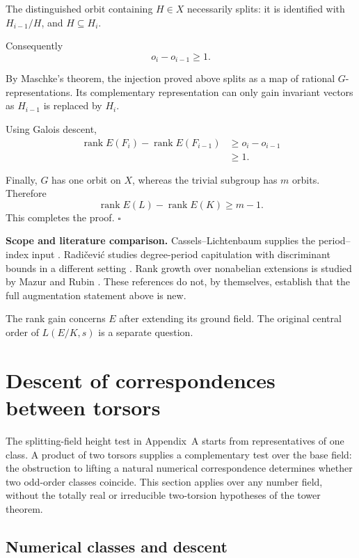 \documentclass[11pt]{article}
\begin{document}
The distinguished orbit containing $H\in X$
necessarily splits: it is identified with
$H_{i-1}/H$, and $H\subseteq H_i$.

Consequently
\[
o_i-o_{i-1}\ge1.
\]

By Maschke's theorem, the injection proved
above splits as a map of rational
$G$-representations. Its complementary
representation can only gain invariant
vectors as $H_{i-1}$ is replaced by $H_i$.

Using Galois descent,
\[
\begin{aligned}
\operatorname{rank}E(F_i)
-\operatorname{rank}E(F_{i-1})
&\ge o_i-o_{i-1}\\
&\ge1.
\end{aligned}
\]

Finally, $G$ has one orbit on $X$, whereas
the trivial subgroup has $m$ orbits. Therefore
\[
\operatorname{rank}E(L)
-\operatorname{rank}E(K)\ge m-1.
\]
This completes the proof.
\hfill$\square$

\medskip
\noindent\textbf{Scope and literature comparison.}
Cassels--Lichtenbaum supplies the period--index
input \cite{FisherVisibility}. Radi\v{c}evi\'c
studies degree-period capitulation with
discriminant bounds in a different setting
\cite{Radicevic}. Rank growth over nonabelian
extensions is studied by Mazur and Rubin
\cite{MazurRubin}. These references do not,
by themselves, establish that the full
augmentation statement above is new.

The rank gain concerns $E$ after extending its ground field. The original
central order of $L(E/K,s)$ is a separate question.


\section{Descent of correspondences between torsors}

The splitting-field height test in Appendix~A starts from representatives of one class. A product of two torsors supplies a complementary test over the base field: the obstruction to lifting a natural numerical correspondence determines whether two odd-order classes coincide. This section applies over any number field, without the totally real or irreducible two-torsion hypotheses of the tower theorem.

\subsection{Numerical classes and descent}
\end{document}
